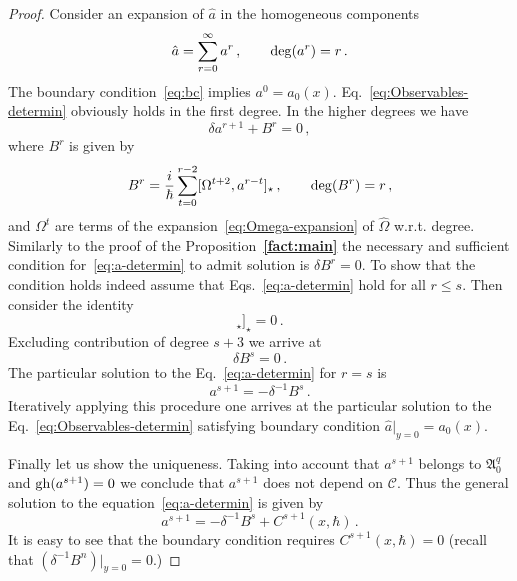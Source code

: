 \documentclass[a4paper,11pt,oneside]{amsart}
\theoremstyle{plain}
\numberwithin{equation}{section} %
\numberwithin{figure}{section} %
\newcommand{\bref}[1]{{\bf \ref{#1}}}
\newcommand{\qcommut}[2]{[#1,#2]_\star}
\newcommand{\gh}[1]{{\rm gh}(#1)}
\renewcommand{\deg}[1]{{\rm deg}(#1)}
\def\cc{{\mathcal C}}
\def\aA{{ \mathfrak A}}
\begin{document}
\begin{proof}
Consider an expansion of $\hat a$ in the homogeneous components
\begin{equation}
    \label{eq:a-expuncion}
\hat a=\sum_{r=0}^\infty a^r\,,\qquad \deg{a^r}=r\,.
\end{equation}
The boundary condition~\eqref{eq:bc} implies
$a^0=a_0(x)$.  Eq.~\eqref{eq:Observables-determin}
obviously holds in the first degree.  In the higher
degrees we have
\begin{equation}
  \label{eq:a-determin}
\delta a^{r+1}+B^r=0\,,
\end{equation}
where $B^r$ is given by
\begin{equation}
B^r=\frac{i}{\hbar}\sum_{t=0}^{r-2}
\qcommut{\Omega^{t+2}}{a^{r-t}}\,,
\qquad
\deg{B^r}=r\,,
\end{equation}
and $\Omega^t$ are terms of the expansion~\eqref{eq:Omega-expansion}
of ${\hat\Omega}$ w.r.t. degree.  Similarly to the proof of the
Proposition~\bref{fact:main} the necessary and sufficient condition
for~\eqref{eq:a-determin} to admit solution is $\delta B^r=0$.  To
show that the condition holds indeed assume that
Eqs.~\eqref{eq:a-determin} hold for all $r\leq s$.  Then consider
the identity
\begin{equation}
  \qcommut{{\hat\Omega}}{\qcommut{{\hat\Omega}}{\hat a}}=0\,.
\end{equation}
Excluding contribution of degree $s+3$ we arrive at
\begin{equation}
\delta B^s=0\,.
\end{equation}
The particular solution to the Eq.~\eqref{eq:a-determin}
for $r=s$ is
\begin{equation}
  a^{s+1}=-\delta^{-1}B^s\,.
\end{equation}
Iteratively applying this procedure one arrives at the particular
solution to the Eq.~\eqref{eq:Observables-determin} satisfying
boundary condition ${\hat a}|_{y=0}=a_0(x)$.

\noindent
Finally let us show the uniqueness.  Taking into account that
$a^{s+1}$ belongs to $\aA^q_0$ and $\gh{a^{s+1}}=0$ we conclude
that $a^{s+1}$ does not depend on $\cc$.  Thus the general
solution to the equation~\eqref{eq:a-determin} is given by
\begin{equation}
  \label{eq:general}
a^{s+1}=-\delta^{-1}B^s+C^{s+1}(x,\hbar)\,.
\end{equation}
It is easy to see that the boundary condition requires
$C^{s+1}(x,\hbar)=0$ (recall that $(\delta^{-1}B^n)|_{y=0}=0$.)
\end{proof}
\end{document}
